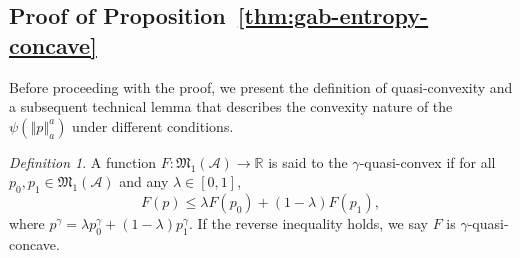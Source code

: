 \documentclass[11pt]{article}
\theoremstyle{plain}
\theoremstyle{remark}
\newtheorem{definition}[theorem]{Definition}
\def\R{\mathbb{R}}
\newcommand{\Acal}{\mathcal{A}}
\newcommand{\Mfrak}{\mathfrak{M}}
\newcommand{\eGAB}{\mathcal{E}_{\mathrm{GAB}}}
\newcommand{\norm}[1]{\left\Vert #1 \right\Vert}
\begin{document}



\subsection{Proof of Proposition~\ref{thm:gab-entropy-concave}}

Before proceeding with the proof, we present the definition of quasi-convexity and a subsequent technical lemma that describes the convexity nature of the $\psi(\norm{p}_a^a)$ under different conditions.

\begin{definition}\label{defn:quasi-convex}
    A function $F : \Mfrak_{1}(\Acal) \to \R$ is said to the $\gamma$-quasi-convex if for all $p_0, p_1 \in \Mfrak_1(\Acal)$ and any $\lambda \in [0, 1]$,
    \begin{equation*}
        F(p) \leq \lambda F(p_0) + (1-\lambda)F(p_1),
    \end{equation*}
    \noindent where $p^\gamma = \lambda p_0^\gamma + (1-\lambda)p_1^\gamma$. If the reverse inequality holds, we say $F$ is $\gamma$-quasi-concave.
\end{definition}
\end{document}
